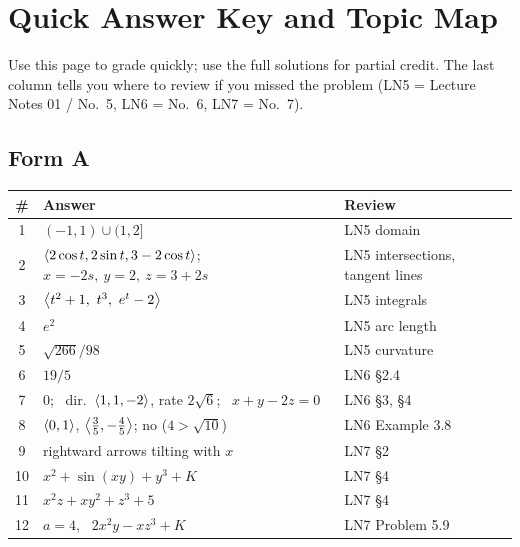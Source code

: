 \section{Quick Answer Key and Topic Map}\label{ch:key}

Use this page to grade quickly; use the full solutions for partial credit.
The last column tells you where to review if you missed the problem
(LN5 = Lecture Notes 01 / No.~5, LN6 = No.~6, LN7 = No.~7).

\subsection*{Form A}
\begin{center}
\renewcommand{\arraystretch}{1.35}
\begin{tabularx}{\linewidth}{c>{\raggedright\arraybackslash}Xl}
\toprule
\# & Answer & Review\\
\midrule
1 & $(-1,1)\cup(1,2]$ & LN5 domain\\
2 & $\left\langle 2\cos t,2\sin t,3-2\cos t \right\rangle$; \ $x=-2s,\ y=2,\ z=3+2s$ & LN5 intersections, tangent lines\\
3 & $\ip{t^2+1,\ t^3,\ e^t-2}$ & LN5 integrals\\
4 & $e^2$ & LN5 arc length\\
5 & $\sqrt{266}/98$ & LN5 curvature\\
6 & $19/5$ & LN6 \S2.4\\
7 & $0$; \ dir.\ $\left\langle 1,1,-2 \right\rangle$, rate $2\sqrt6$; \ $x+y-2z=0$ & LN6 \S3, \S4\\
8 & $\left\langle 0,1 \right\rangle$, $\left\langle \frac35,-\frac45 \right\rangle$; no ($4>\sqrt{10}$) & LN6 Example 3.8\\
9 & rightward arrows tilting with $x$ & LN7 \S2\\
10 & $x^2+\sin(xy)+y^3+K$ & LN7 \S4\\
11 & $x^2z+xy^2+z^3+5$ & LN7 \S4\\
12 & $a=4$, \ $2x^2y-xz^3+K$ & LN7 Problem 5.9\\
\bottomrule
\end{tabularx}
\end{center}

